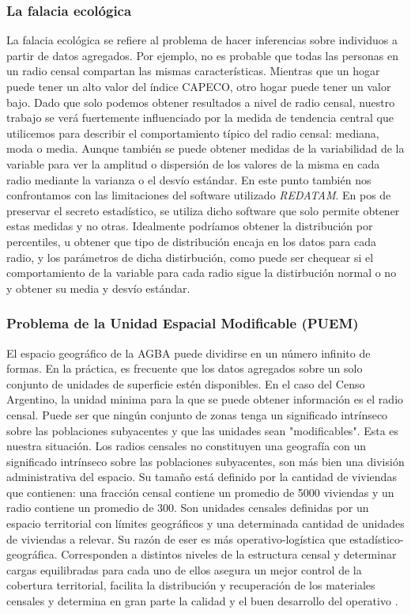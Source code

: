	\subsubsection{La falacia ecológica}

La falacia ecológica se refiere al problema de hacer inferencias sobre individuos a partir de datos agregados. Por ejemplo, no es probable que todas las personas en un radio censal compartan las mismas características. Mientras que un hogar puede tener un alto valor del índice CAPECO, otro hogar puede tener un valor bajo. Dado que solo podemos obtener resultados a nivel de radio censal, nuestro trabajo se verá fuertemente influenciado por la medida de tendencia central que utilicemos para describir el comportamiento típico del radio censal: mediana, moda o media. Aunque también se puede obtener medidas de la variabilidad de la variable para ver la amplitud o dispersión de los valores de la misma en cada radio mediante la varianza o el desvío estándar. En este punto también nos confrontamos con las limitaciones del software utilizado \textit{REDATAM}. En pos de preservar el secreto estadístico, se utiliza dicho software que solo permite obtener estas medidas y no otras. Idealmente podríamos obtener la distribución por percentiles, u obtener que tipo de distribución encaja en los datos para cada radio, y los parámetros de dicha distirbución, como puede ser chequear si el comportamiento de la variable para cada radio sigue la distirbución normal o no y obtener su media y desvío estándar. 

	
	\subsubsection{Problema   de   la   Unidad   Espacial   Modificable   (PUEM)}
	
El espacio geográfico de la AGBA puede dividirse en un número infinito de formas. En la práctica, es frecuente que los datos agregados sobre un solo conjunto de unidades de superficie estén disponibles. En el caso del Censo Argentino, la unidad minima para la que se puede obtener información es el radio censal. Puede ser que ningún conjunto de zonas tenga un significado intrínseco sobre las poblaciones subyacentes y que las unidades sean "modificables". Esta es nuestra situación. Los radios censales no constituyen una geografía con un significado intrínseco sobre las poblaciones subyacentes, son más bien una división administrativa del espacio. Su tamaño está definido por la cantidad de viviendas que contienen: una fracción censal contiene un promedio de 5000 viviendas y un radio contiene un promedio de 300. Son unidades censales definidas por un espacio territorial con límites geográficos y una determinada cantidad de unidades de viviendas a relevar. Su razón de eser es más operativo-logística que estadístico-geográfica. Corresponden a distintos niveles de la estructura censal y determinar cargas equilibradas para cada uno de ellos asegura un mejor control de la cobertura territorial, facilita la distribución y recuperación de los materiales censales y determina en gran parte la calidad y el buen desarrollo del operativo \cite{ipec_a}.

